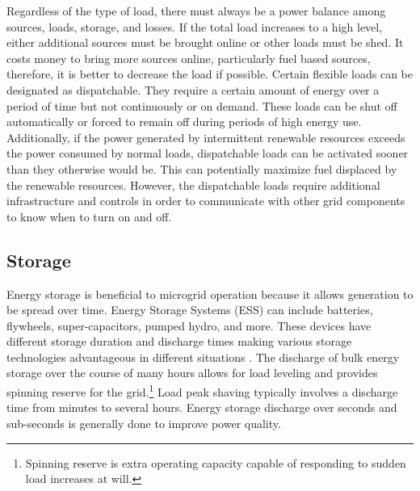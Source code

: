 Regardless of the type of load, there must always be a power balance among sources, loads, storage, and losses. If the total load increases to a high level, either additional sources must be brought online or other loads must be shed. It costs money to bring more sources online, particularly fuel based sources, therefore, it is better to decrease the load if possible. Certain flexible loads can be designated as dispatchable. They require a certain amount of energy over a period of time but not continuously or on demand. These loads can be shut off automatically or forced to remain off during periods of high energy use. Additionally, if the power generated by intermittent renewable resources exceeds the power consumed by normal loads, dispatchable loads can be activated sooner than they otherwise would be. This can potentially maximize fuel displaced by the renewable resources. However, the dispatchable loads require additional infrastructure and controls in order to communicate with other grid components to know when to turn on and off.

\subsection{Storage}
Energy storage is beneficial to microgrid operation because it allows generation to be spread over time. Energy Storage Systems (ESS) can include batteries, flywheels, super-capacitors, pumped hydro, and more. These devices have different storage duration and discharge times making various storage technologies advantageous in different situations \cite{Schoenung2003}. The discharge of bulk energy storage over the course of many hours allows for load leveling and provides spinning reserve for the grid.\footnote{Spinning reserve is extra operating capacity capable of responding to sudden load increases at will.} Load peak shaving typically involves a discharge time from minutes to several hours. Energy storage discharge over seconds and sub-seconds is generally done to improve power quality.


